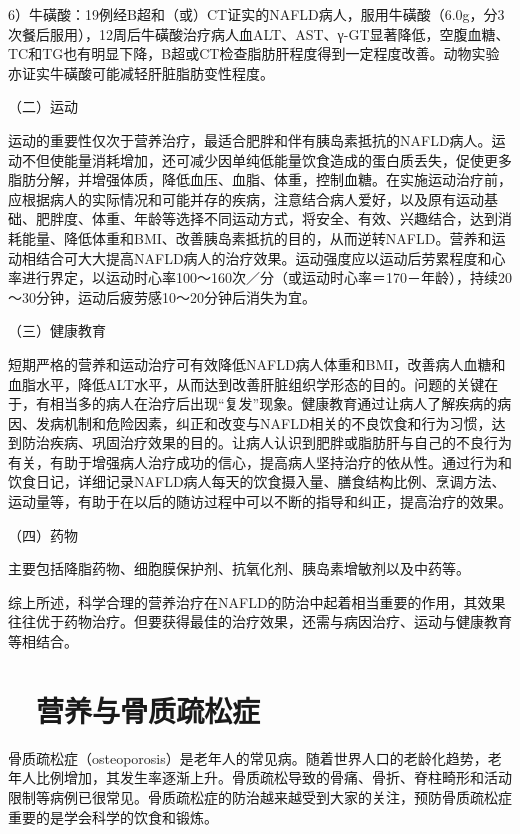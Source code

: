 6）牛磺酸：19例经B超和（或）CT证实的NAFLD病人，服用牛磺酸（6.0g，分3次餐后服用），12周后牛磺酸治疗病人血ALT、AST、γ-GT显著降低，空腹血糖、TC和TG也有明显下降，B超或CT检查脂肪肝程度得到一定程度改善。动物实验亦证实牛磺酸可能减轻肝脏脂肪变性程度。

（二）运动

运动的重要性仅次于营养治疗，最适合肥胖和伴有胰岛素抵抗的NAFLD病人。运动不但使能量消耗增加，还可减少因单纯低能量饮食造成的蛋白质丢失，促使更多脂肪分解，并增强体质，降低血压、血脂、体重，控制血糖。在实施运动治疗前，应根据病人的实际情况和可能并存的疾病，注意结合病人爱好，以及原有运动基础、肥胖度、体重、年龄等选择不同运动方式，将安全、有效、兴趣结合，达到消耗能量、降低体重和BMI、改善胰岛素抵抗的目的，从而逆转NAFLD。营养和运动相结合可大大提高NAFLD病人的治疗效果。运动强度应以运动后劳累程度和心率进行界定，以运动时心率100～160次／分（或运动时心率＝170－年龄），持续20～30分钟，运动后疲劳感10～20分钟后消失为宜。

（三）健康教育

短期严格的营养和运动治疗可有效降低NAFLD病人体重和BMI，改善病人血糖和血脂水平，降低ALT水平，从而达到改善肝脏组织学形态的目的。问题的关键在于，有相当多的病人在治疗后出现“复发”现象。健康教育通过让病人了解疾病的病因、发病机制和危险因素，纠正和改变与NAFLD相关的不良饮食和行为习惯，达到防治疾病、巩固治疗效果的目的。让病人认识到肥胖或脂肪肝与自己的不良行为有关，有助于增强病人治疗成功的信心，提高病人坚持治疗的依从性。通过行为和饮食日记，详细记录NAFLD病人每天的饮食摄入量、膳食结构比例、烹调方法、运动量等，有助于在以后的随访过程中可以不断的指导和纠正，提高治疗的效果。

（四）药物

主要包括降脂药物、细胞膜保护剂、抗氧化剂、胰岛素增敏剂以及中药等。

综上所述，科学合理的营养治疗在NAFLD的防治中起着相当重要的作用，其效果往往优于药物治疗。但要获得最佳的治疗效果，还需与病因治疗、运动与健康教育等相结合。

\hypertarget{text00004.htmlux5cux23mllj34}{%
\section{　营养与骨质疏松症}\label{text00004.htmlux5cux23mllj34}}

骨质疏松症（osteoporosis）是老年人的常见病。随着世界人口的老龄化趋势，老年人比例增加，其发生率逐渐上升。骨质疏松导致的骨痛、骨折、脊柱畸形和活动限制等病例已很常见。骨质疏松症的防治越来越受到大家的关注，预防骨质疏松症重要的是学会科学的饮食和锻炼。


